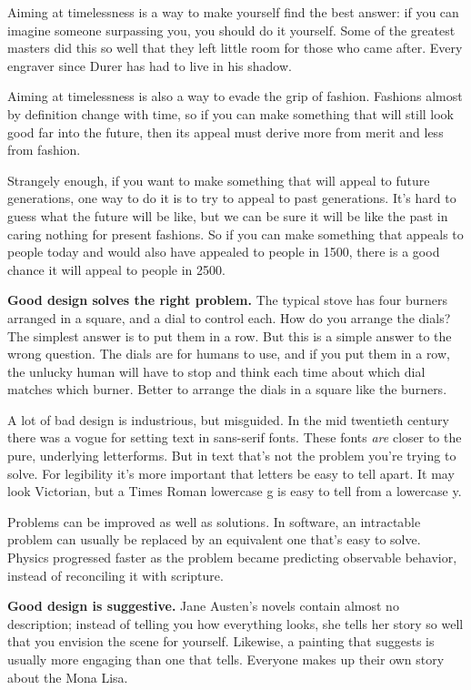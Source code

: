 Aiming at timelessness is a way to make
yourself find the best answer:
if you can imagine someone surpassing you, you should do it yourself.
Some of the greatest masters did this so well that they
left little room for those who came after.
Every engraver since Durer has had to live in his shadow.

Aiming at timelessness is also a way to evade
the grip of fashion.  Fashions almost by definition
change with time, so if you can make something that
will still look good far into the future, then its
appeal must derive more from merit and less from fashion.

Strangely enough, if you want to make something that will 
appeal to future generations, one way to do it is to
try to appeal to past generations.  It's hard to guess what
the future will be like, but we can be sure it will be
like the past in caring nothing for present fashions.
So if you can make something that appeals to people today
and would also have appealed to people in 1500, there is a good
chance it will appeal to people in 2500.



\textbf{Good design solves the right problem.} The typical
stove has four burners arranged in a square, and a dial
to control each.  How do you arrange the dials?  The
simplest answer is to put them in a row.  But this is a
simple answer to the wrong question.
The dials are for humans to use, and if you put them in a row,
the unlucky human will have to stop and think each time
about which dial matches which burner.  Better to arrange the dials
in a square like the burners.

A lot of bad design is industrious, but misguided.
In the mid twentieth century there was a vogue for
setting text in sans-serif fonts.
These fonts \emph{are} closer to the pure, underlying letterforms.
But in text that's not the problem you're trying to solve. 
For legibility it's more important that letters be easy
to tell apart.
It may look Victorian, but a Times Roman lowercase g is
easy to tell from a lowercase y.

Problems can be improved as well as solutions.
In software, an intractable problem can usually be replaced
by an equivalent one that's easy to solve.
Physics progressed faster as the problem became
predicting observable behavior, instead of reconciling it
with scripture.



\textbf{Good design is suggestive.}
Jane Austen's novels contain almost no
description; instead of telling you how
everything looks, she tells her story so well that you   
envision the scene for yourself.
Likewise, a painting that suggests is usually more engaging
than one that tells.  Everyone makes up their own story about the
Mona Lisa.

